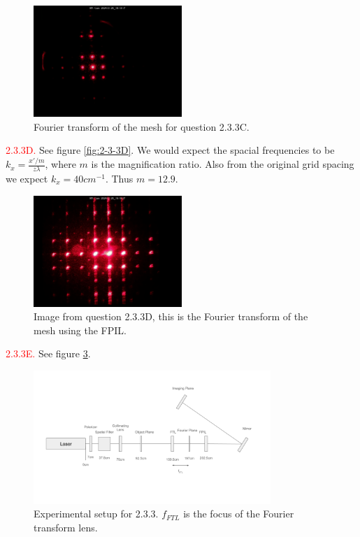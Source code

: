 \documentclass[letterpaper, reqno,11pt]{article}
\begin{document}
\begin{figure}[tb]
    \centering
    \includegraphics[width=0.5\textwidth]{Fourier/mesh_nozone/media/im_0054_20240126_181317.jpg}
    \caption{Fourier transform of the mesh for question 2.3.3C.}
    \label{fig:2-3-3C}
\end{figure}

\noindent \textcolor{red}{2.3.3D.} See figure \ref{fig:2-3-3D}. We would expect the spacial frequencies to be $k_x= \frac{x' /m}{z\lambda}$, where $m$ is the magnification ratio. Also from the original grid spacing we expect $k_x=40 cm^{-1}$. Thus $m=12.9$.

\begin{figure}[tb]
    \centering
    \includegraphics[width=0.5\textwidth]{Fourier/2D/media/im_0083_20240126_191927.jpg}
    \caption{Image from question 2.3.3D, this is the Fourier transform of the mesh using the FPIL.}
    \label{fig:Fourier-2D-media-im_0083_20240126_191927-jpg}
\end{figure}

\noindent \textcolor{red}{2.3.3E.} See figure \ref{fig:2-3-3E}.

\begin{figure}[tb]
    \centering
    \includegraphics[width=0.8\textwidth]{2-3-3E}
    \caption{Experimental setup for 2.3.3. $f_{FTL}$ is the focus of the Fourier transform lens.}
    \label{fig:2-3-3E}
\end{figure}
\end{document}
